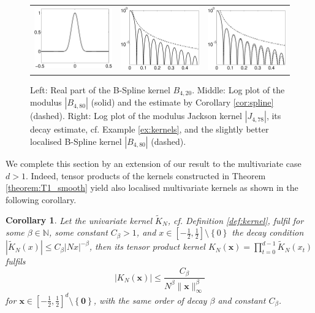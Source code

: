 \documentclass[11pt,a4paper,bibtotoc]{scrartcl}
\def\N{\mathbb{N}}
\newcommand{\zb}[1]{\ensuremath{\boldsymbol{#1}}}
\newtheorem{corollary}[theorem]{Corollary}
\newenvironment{Corollary}{\goodbreak \begin{corollary}\rm}{\end{corollary}}
\numberwithin{equation}{section}
\numberwithin{table}{section}
\numberwithin{figure}{section}
\begin{document}
\begin{figure}[ht]
  \begin{center}
    \begin{tabular}{ccc}
      \includegraphics[width=4cm]{images/polynomial_kernels3.eps} &
      \includegraphics[width=4cm]{images/polynomial_kernels5.eps} &
      \includegraphics[width=4cm]{images/polynomial_kernels6.eps}
    \end{tabular}
  \end{center}
  \caption{Left: Real part of the B-Spline kernel $B_{4,20}$.
    Middle: Log plot of the modulus $|B_{4,80}|$ (solid) and the estimate by
    Corollary \ref{cor:spline} (dashed).
    Right: Log plot of the modulus Jackson kernel $|J_{4,78}|$, its decay
    estimate, cf. Example \ref{ex:kernels}, and the slightly better localised
    B-Spline kernel $|B_{4,80}|$ (dashed). \label{Fig:polykerne2}}
\end{figure}

We complete this section by an extension of our result to the multivariate
case $d>1$.
Indeed, tensor products of the kernels constructed in Theorem
\ref{theorem:T1_smooth} yield also localised multivariate kernels as shown in
the following corollary.

\begin{Corollary}\label{cor:tensorproduct}
  Let the univariate kernel $\tilde K_N$, cf. Definition
  \ref{def:kernel}, fulfil for some $\beta\in\N$, some constant $C_{\beta}>1$,
  and $x\in\left[-\frac{1}{2}, \frac{1}{2}\right]\setminus\left\{0\right\}$
  the decay condition $|\tilde K_N(x)| \le C_{\beta} |Nx|^{-\beta}$, then its
  tensor product kernel $K_N(\zb x)=\prod\limits_{t=0}^{d-1} \tilde K_N(x_t)$
  fulfils
  \begin{equation*}
    \left|K_N\left(\zb x\right)\right| \le \frac{C_{\beta}}
    {N^{\beta}\|\zb x\|_{\infty}^{\beta}}
  \end{equation*}
  for $\zb x\in\left[-\frac{1}{2}, \frac{1}{2}\right]^d\setminus\left\{\zb
  0\right\}$, with the same order of decay $\beta$ and constant $C_{\beta}$.
\end{Corollary}
\end{document}

